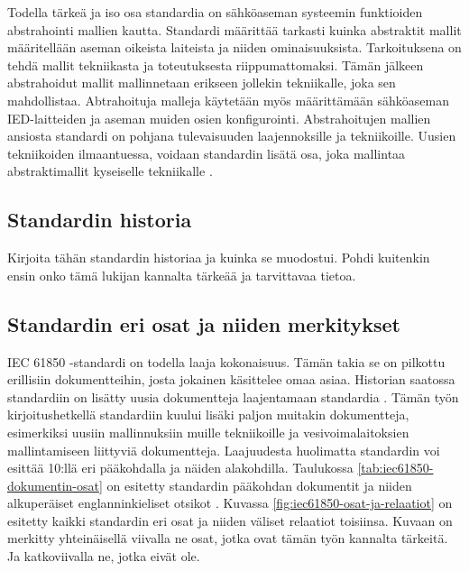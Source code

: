 Todella tärkeä ja iso osa standardia on sähköaseman systeemin funktioiden abstrahointi mallien kautta. Standardi määrittää tarkasti kuinka abstraktit mallit määritellään aseman oikeista laiteista ja niiden ominaisuuksista. Tarkoituksena on tehdä mallit tekniikasta ja toteutuksesta riippumattomaksi. Tämän jälkeen abstrahoidut mallit mallinnetaan erikseen jollekin tekniikalle, joka sen mahdollistaa. Abtrahoituja malleja käytetään myös määrittämään sähköaseman IED-laitteiden ja aseman muiden osien konfigurointi. Abstrahoitujen mallien ansiosta standardi on pohjana tulevaisuuden laajennoksille ja tekniikoille. Uusien tekniikoiden ilmaantuessa, voidaan standardin lisätä  osa, joka  mallintaa abstraktimallit kyseiselle tekniikalle \cite[s.~2]{Brunner2008}.


\subsection{Standardin historia}
\begin{it}
	Kirjoita tähän standardin historiaa ja kuinka se muodostui. Pohdi kuitenkin ensin onko tämä lukijan kannalta tärkeää ja tarvittavaa tietoa.
\end{it}


\subsection{Standardin eri osat ja niiden merkitykset}	
IEC 61850 -standardi on todella laaja kokonaisuus. Tämän takia se on pilkottu erillisiin dokumentteihin, josta jokainen käsittelee omaa asiaa. Historian saatossa standardiin on lisätty uusia dokumentteja laajentamaan standardia \cite{IEC61850series, New-documents-by-IEC-TC-57} \cite[s.~13]{IEC61850-1}. Tämän työn kirjoitushetkellä standardiin kuului lisäki paljon muitakin dokumentteja, esimerkiksi uusiin mallinnuksiin muille tekniikoille ja vesivoimalaitoksien mallintamiseen liittyviä dokumentteja. Laajuudesta huolimatta standardin voi esittää 10:llä eri pääkohdalla ja näiden alakohdilla. Taulukossa \ref{tab:iec61850-dokumentin-osat} on esitetty standardin pääkohdan dokumentit ja niiden alkuperäiset englanninkieliset otsikot \cite[s.~2]{Mackiewicz2006} \cite{IEC61850series}. Kuvassa \ref{fig:iec61850-osat-ja-relaatiot} on esitetty kaikki standardin eri osat ja niiden väliset relaatiot toisiinsa. Kuvaan on merkitty yhteinäisellä viivalla ne osat, jotka ovat tämän työn kannalta tärkeitä. Ja katkoviivalla ne, jotka eivät ole.

